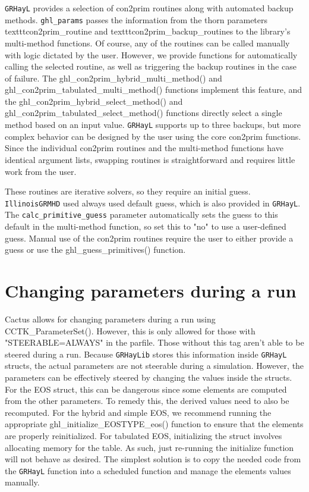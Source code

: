 \documentclass{article}
\newcommand{\grhayl}{\texttt{GRHayL}\xspace}
\newcommand{\glib}{\texttt{GRHayLib}\xspace}
\newcommand{\igm}{\texttt{IllinoisGRMHD}\xspace}
\begin{document}
\grhayl provides a selection of con2prim routines along with automated
backup methods. \texttt{ghl\_params} passes the information from the
thorn parameters texttt{con2prim\_routine} and texttt{con2prim\_backup\_routines}
to the library's multi-method functions. Of course, any of the routines
can be called manually with logic dictated by the user. However, we
provide functions for automatically calling the selected routine,
as well as triggering the backup routines in the case of failure.
The ghl\_con2prim\_hybrid\_multi\_method() and
ghl\_con2prim\_tabulated\_multi\_method() functions implement this
feature, and the ghl\_con2prim\_hybrid\_select\_method() and
ghl\_con2prim\_tabulated\_select\_method() functions directly select
a single method based on an input value. \grhayl supports up to three
backups, but more complex behavior can be designed by the user using
the core con2prim functions. Since the individual con2prim routines
and the multi-method functions have identical argument lists, swapping
routines is straightforward and requires little work from the user.

These routines are iterative solvers, so they require an initial guess.
\igm used always used default guess, which is also provided in \grhayl.
The \texttt{calc\_primitive\_guess} parameter automatically sets the
guess to this default in the multi-method function, so set this to
"no" to use a user-defined guess. Manual use of the con2prim
routines require the user to either provide a guess or use the
ghl\_guess\_primitives() function.

\section{Changing parameters during a run}

Cactus allows for changing parameters during a run using CCTK\_ParameterSet().
However, this is only allowed for those with "STEERABLE=ALWAYS" in the parfile.
Those without this tag aren't able to be steered during a run. Because \glib
stores this information inside \grhayl structs, the actual parameters are not
steerable during a simulation. However, the parameters can be effectively steered
by changing the values inside the structs. For the EOS struct, this can be
dangerous since some elements are computed from the other parameters. To remedy
this, the derived values need to also be recomputed. For the hybrid and simple EOS,
we recommend running the appropriate ghl\_initialize\_EOSTYPE\_eos() function
to ensure that the elements are properly reinitialized. For tabulated EOS,
initializing the struct involves allocating memory for the table. As such,
just re-running the initialize function will not behave as desired. The simplest
solution is to copy the needed code from the \grhayl function into a scheduled
function and manage the elements values manually.
\end{document}
